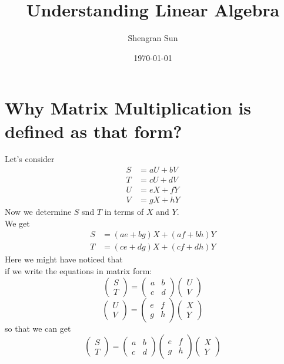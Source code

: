 \documentclass[12pt]{article}
\title{Understanding Linear Algebra}
\author{Shengran Sun}
\date{\today}
\begin{document}
\maketitle

\section{Why Matrix Multiplication is defined as that form?}

Let's consider 
\begin{align*}
S &= aU + bV \\
T &= cU + dV \\
U &= eX + fY \\
V &= gX + hY
\end{align*}
\indent Now we determine $S$ snd $T$ in terms of $X$ and $Y$.\\
\indent We get
\begin{align*}
S &= (ae + bg)X + (af + bh)Y \\
T &= (ce + dg)X + (cf + dh)Y
\end{align*}
\indent Here we might have noticed that \\
\indent if we write the equations in matrix form:
\[
\begin{pmatrix} S \\ T \end{pmatrix} = 
\begin{pmatrix} a & b \\ c & d \end{pmatrix}
\begin{pmatrix} U \\ V \end{pmatrix}
\]
\[
\begin{pmatrix} U \\ V \end{pmatrix} = 
\begin{pmatrix} e & f \\ g & h \end{pmatrix}
\begin{pmatrix} X \\ Y \end{pmatrix}
\]
\indent so that we can get \\
\[
\begin{pmatrix} S \\ T \end{pmatrix} = 
\begin{pmatrix} a & b \\ c & d \end{pmatrix}
\begin{pmatrix} e & f \\ g & h \end{pmatrix}
\begin{pmatrix} X \\ Y \end{pmatrix}
\]
\end{document}
